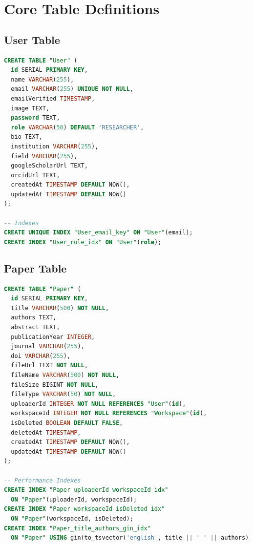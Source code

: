 \section{Core Table Definitions}
\label{sec:schema-tables}

\subsection{User Table}

\begin{lstlisting}[language=SQL, caption={User Table Schema}]
CREATE TABLE "User" (
  id SERIAL PRIMARY KEY,
  name VARCHAR(255),
  email VARCHAR(255) UNIQUE NOT NULL,
  emailVerified TIMESTAMP,
  image TEXT,
  password TEXT,
  role VARCHAR(50) DEFAULT 'RESEARCHER',
  bio TEXT,
  institution VARCHAR(255),
  field VARCHAR(255),
  googleScholarUrl TEXT,
  orcidUrl TEXT,
  createdAt TIMESTAMP DEFAULT NOW(),
  updatedAt TIMESTAMP DEFAULT NOW()
);

-- Indexes
CREATE UNIQUE INDEX "User_email_key" ON "User"(email);
CREATE INDEX "User_role_idx" ON "User"(role);
\end{lstlisting}

\subsection{Paper Table}

\begin{lstlisting}[language=SQL, caption={Paper Table Schema}]
CREATE TABLE "Paper" (
  id SERIAL PRIMARY KEY,
  title VARCHAR(500) NOT NULL,
  authors TEXT,
  abstract TEXT,
  publicationYear INTEGER,
  journal VARCHAR(255),
  doi VARCHAR(255),
  fileUrl TEXT NOT NULL,
  fileName VARCHAR(500) NOT NULL,
  fileSize BIGINT NOT NULL,
  fileType VARCHAR(50) NOT NULL,
  uploaderId INTEGER NOT NULL REFERENCES "User"(id),
  workspaceId INTEGER NOT NULL REFERENCES "Workspace"(id),
  isDeleted BOOLEAN DEFAULT FALSE,
  deletedAt TIMESTAMP,
  createdAt TIMESTAMP DEFAULT NOW(),
  updatedAt TIMESTAMP DEFAULT NOW()
);

-- Performance Indexes
CREATE INDEX "Paper_uploaderId_workspaceId_idx" 
  ON "Paper"(uploaderId, workspaceId);
CREATE INDEX "Paper_workspaceId_isDeleted_idx" 
  ON "Paper"(workspaceId, isDeleted);
CREATE INDEX "Paper_title_authors_gin_idx" 
  ON "Paper" USING gin(to_tsvector('english', title || ' ' || authors));
\end{lstlisting}


